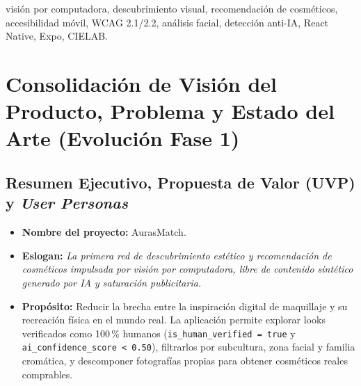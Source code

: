 \documentclass[conference]{IEEEtran}
\begin{document}
\begin{IEEEkeywords}
visión por computadora, descubrimiento visual, recomendación de cosméticos, accesibilidad móvil, WCAG 2.1/2.2, análisis facial, detección anti-IA, React Native, Expo, CIELAB.
\end{IEEEkeywords}

\section{Consolidación de Visión del Producto, Problema y Estado del Arte (Evolución Fase 1)}

\subsection{Resumen Ejecutivo, Propuesta de Valor (UVP) y \textit{User Personas}}
\begin{itemize}
    \item \textbf{Nombre del proyecto:} AurasMatch.
    \item \textbf{Eslogan:} \textit{La primera red de descubrimiento estético y recomendación de cosméticos impulsada por visión por computadora, libre de contenido sintético generado por IA y saturación publicitaria.}
    \item \textbf{Propósito:} Reducir la brecha entre la inspiración digital de maquillaje y su recreación física en el mundo real. La aplicación permite explorar looks verificados como 100\,\% humanos (\texttt{is\_human\_verified = true} y \texttt{ai\_confidence\_score < 0.50}), filtrarlos por subcultura, zona facial y familia cromática, y descomponer fotografías propias para obtener cosméticos reales comprables.
\end{itemize}
\end{document}

